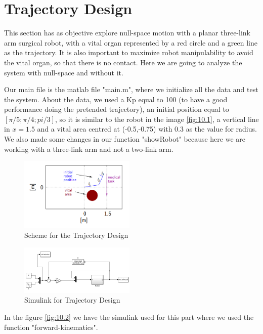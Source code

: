 \section{Trajectory Design}

This section has as objective explore null-space motion with a planar three-link arm surgical robot, with a vital organ represented by a red circle and a green line as the trajectory. It is also important to maximize robot manipulability to avoid the vital organ, so that there is no contact. Here we are going to analyze the system with null-space and without it. 

Our main file is the matlab file "main.m", where we initialize all the data and test the system.
About the data, we used a Kp equal to 100 (to have a good performance doing the pretended trajectory), an initial position equal to $[\pi/5;\pi/4;pi/3]$, so it is similar to the robot in the image \eqref{fig:10.1}, a vertical line in $x = 1.5$ and a vital area centred at (-0.5,-0.75) with 0.3 as the value for radius. We also made some changes in our function "showRobot" because here we are working with a three-link arm and not a two-link arm.

\begin{figure}[H]
    \centering
    \includegraphics[width=0.49\textwidth]{imgs/10.1.png}
    \caption{Scheme for the Trajectory Design}
    \label{fig:10.1}
\end{figure}

\begin{figure}[H]
    \centering
    \includegraphics[width=0.49\textwidth]{imgs/10.2.png}
    \caption{Simulink for Trajectory Design}
    \label{fig:10.2}
\end{figure}

In the figure \eqref{fig:10.2} we have the simulink used for this part where we used the function "forward-kinematics".


